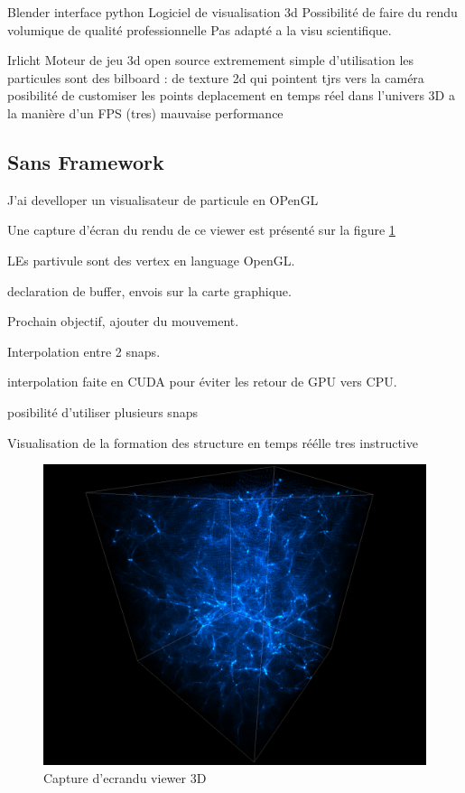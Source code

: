Blender 
interface python
Logiciel de visualisation 3d
Possibilité de faire du rendu volumique de qualité professionnelle
Pas adapté a la visu scientifique.


Irlicht
Moteur de jeu 3d open source 
extremement simple d'utilisation
les particules sont des bilboard : de texture 2d qui pointent tjrs vers la caméra
posibilité de customiser les points
deplacement en temps réel dans l'univers 3D a la manière d'un FPS
(tres) mauvaise performance 



\subsection{Sans Framework}

J'ai develloper un visualisateur de particule en OPenGL

Une capture d'écran du rendu de ce viewer est présenté sur la figure \ref{fig:viewer}

LEs partivule sont des vertex en language OpenGL.

declaration de buffer, envois sur la carte graphique.


Prochain objectif, ajouter du mouvement.

Interpolation entre 2 snaps.

interpolation faite en CUDA pour éviter les retour de GPU vers CPU.

posibilité d'utiliser plusieurs snaps 

Visualisation de la formation des structure en temps réélle tres instructive



\begin{figure}[bth]
        \includegraphics[width=.95\linewidth]{img/04/part.png} 
        \caption{Capture d'ecrandu viewer 3D  }
 		\label{fig:viewer}
\end{figure}
